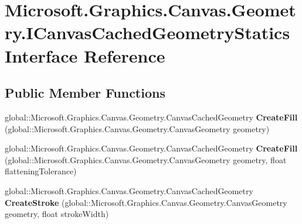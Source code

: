 \hypertarget{interface_microsoft_1_1_graphics_1_1_canvas_1_1_geometry_1_1_i_canvas_cached_geometry_statics}{}\section{Microsoft.\+Graphics.\+Canvas.\+Geometry.\+I\+Canvas\+Cached\+Geometry\+Statics Interface Reference}
\label{interface_microsoft_1_1_graphics_1_1_canvas_1_1_geometry_1_1_i_canvas_cached_geometry_statics}
\subsection*{Public Member Functions}
\begin{DoxyCompactItemize}
\item 
\mbox{\label{interface_microsoft_1_1_graphics_1_1_canvas_1_1_geometry_1_1_i_canvas_cached_geometry_statics_a16df585fb0ca36d40ef89871533acc2a}} 
global\+::\+Microsoft.\+Graphics.\+Canvas.\+Geometry.\+Canvas\+Cached\+Geometry {\bfseries Create\+Fill} (global\+::\+Microsoft.\+Graphics.\+Canvas.\+Geometry.\+Canvas\+Geometry geometry)
\item 
\mbox{\label{interface_microsoft_1_1_graphics_1_1_canvas_1_1_geometry_1_1_i_canvas_cached_geometry_statics_af902923a82387d578dcc6b4a2ac54662}} 
global\+::\+Microsoft.\+Graphics.\+Canvas.\+Geometry.\+Canvas\+Cached\+Geometry {\bfseries Create\+Fill} (global\+::\+Microsoft.\+Graphics.\+Canvas.\+Geometry.\+Canvas\+Geometry geometry, float flattening\+Tolerance)
\item 
\mbox{\label{interface_microsoft_1_1_graphics_1_1_canvas_1_1_geometry_1_1_i_canvas_cached_geometry_statics_a979cdeceea3a10a40d02ca0440985082}} 
global\+::\+Microsoft.\+Graphics.\+Canvas.\+Geometry.\+Canvas\+Cached\+Geometry {\bfseries Create\+Stroke} (global\+::\+Microsoft.\+Graphics.\+Canvas.\+Geometry.\+Canvas\+Geometry geometry, float stroke\+Width)
\item 
\mbox{\label{interface_microsoft_1_1_graphics_1_1_canvas_1_1_geometry_1_1_i_canvas_cached_geometry_statics_a468aa4e2b6369a93bc595faa4775ecd3}} 

\end{DoxyCompactItemize}
